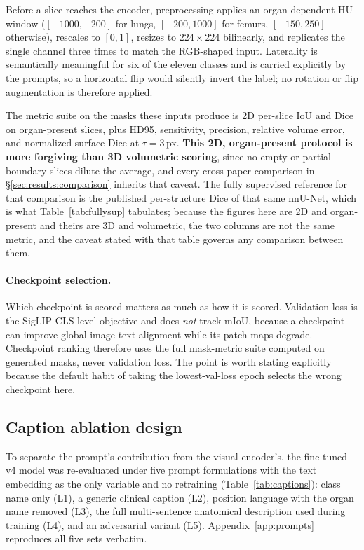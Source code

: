 Before a slice reaches the encoder, preprocessing applies an organ-dependent HU
window ($[-1000, -200]$ for lungs, $[-200, 1000]$ for femurs, $[-150, 250]$
otherwise), rescales to $[0,1]$, resizes to $224\times224$ bilinearly, and
replicates the single channel three times to match the RGB-shaped input.
Laterality is semantically meaningful for six of the eleven classes and is
carried explicitly by the prompts, so a horizontal flip would silently invert
the label; no rotation or flip augmentation is therefore applied.

The metric suite on the masks these inputs produce is 2D per-slice IoU and Dice
on organ-present slices, plus HD95, sensitivity, precision, relative volume
error, and normalized surface Dice \cite{nikolov2021nsd} at $\tau = 3$\,px.
\textbf{This 2D, organ-present protocol is more forgiving than 3D volumetric
scoring}, since no empty or partial-boundary slices dilute the average, and
every cross-paper comparison in \S\ref{sec:results:comparison} inherits that
caveat. The fully supervised reference for that comparison is the
published per-structure Dice of that same nnU-Net, which is what
Table~\ref{tab:fullysup} tabulates; because the figures here are 2D and
organ-present and theirs are 3D and volumetric, the two columns are not the same
metric, and the caveat stated with that table governs any comparison between
them.

\paragraph{Checkpoint selection.}
Which checkpoint is scored matters as much as how it is scored. Validation loss
is the SigLIP CLS-level objective and does \emph{not} track mIoU, because a
checkpoint can improve global image-text alignment while its patch maps
degrade. Checkpoint ranking therefore uses the full mask-metric suite computed
on generated masks, never validation loss. The point is worth stating explicitly
because the default habit of taking the lowest-val-loss epoch selects the wrong
checkpoint here.

\subsection{Caption ablation design}
\label{sec:methods:captions}

To separate the prompt's contribution from the visual encoder's, the fine-tuned
v4 model was re-evaluated under five prompt formulations with the text embedding
as the only variable and no retraining (Table~\ref{tab:captions}): class name
only (L1), a generic clinical caption (L2), position language with the organ
name removed (L3), the full multi-sentence anatomical description used during
training (L4), and an adversarial variant (L5). Appendix~\ref{app:prompts}
reproduces all five sets verbatim.

